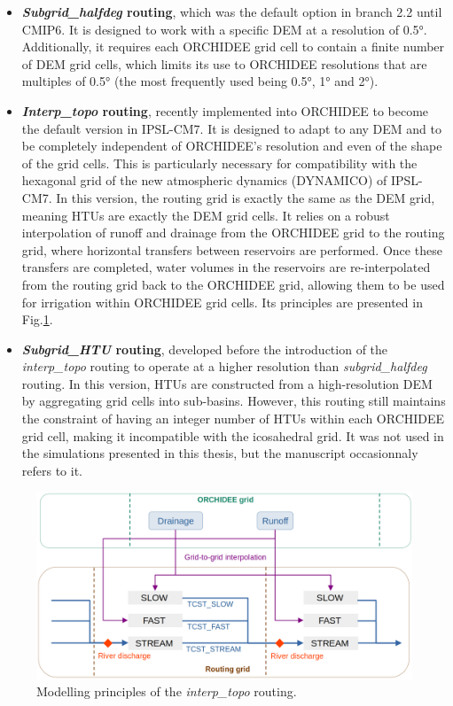 \begin{itemize}
\item \textbf{\textit{Subgrid\_halfdeg} routing}, which was the default option in branch 2.2 until CMIP6. It is designed to work with a specific DEM at a resolution of 0.5°. Additionally, it requires each ORCHIDEE grid cell to contain a finite number of DEM grid cells, which limits its use to ORCHIDEE resolutions that are multiples of 0.5° (the most frequently used being 0.5°, 1° and 2°).

\item \textbf{\textit{Interp\_topo} routing}, recently implemented into ORCHIDEE to become the default version in IPSL-CM7. It is designed to adapt to any DEM and to be completely independent of ORCHIDEE’s resolution and even of the shape of the grid cells. This is particularly necessary for compatibility with the hexagonal grid of the new atmospheric dynamics (DYNAMICO) of IPSL-CM7.
In this version, the routing grid is exactly the same as the DEM grid, meaning HTUs are exactly the DEM grid cells. It relies on a robust interpolation of runoff and drainage from the ORCHIDEE grid to the routing grid, where horizontal transfers between reservoirs are performed. Once these transfers are completed, water volumes in the reservoirs are re-interpolated from the routing grid back to the ORCHIDEE grid, allowing them to be used for irrigation within ORCHIDEE grid cells. Its principles are presented in Fig.\ref{fig:routing_principles}.

\item \textbf{\textit{Subgrid\_HTU} routing}, developed before the introduction of the \textit{interp\_topo} routing to operate at a higher resolution than \textit{subgrid\_halfdeg} routing. In this version, HTUs are constructed from a high-resolution DEM by aggregating grid cells into sub-basins. However, this routing still maintains the constraint of having an integer number of HTUs within each ORCHIDEE grid cell, making it incompatible with the icosahedral grid. It was not used in the simulations presented in this thesis, but the manuscript occasionnaly refers to it.
\end{itemize}

\begin{figure}[ht]
    \centering
    \includegraphics[width=1\textwidth]{images/methods/routing_principles.png}
    \caption{Modelling principles of the \textit{interp\_topo} routing.}
    \label{fig:routing_principles}
\end{figure}

